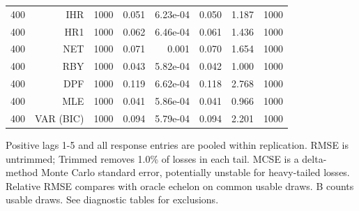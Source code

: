 \begin{table}[p]
\begin{tabular}{rrrrrrrr}
400 & IHR & 1000 & 0.051 & 6.23e-04 & 0.050 & 1.187 & 1000 \\
400 & HR1 & 1000 & 0.062 & 6.46e-04 & 0.061 & 1.436 & 1000 \\
400 & NET & 1000 & 0.071 & 0.001 & 0.070 & 1.654 & 1000 \\
400 & RBY & 1000 & 0.043 & 5.82e-04 & 0.042 & 1.000 & 1000 \\
400 & DPF & 1000 & 0.119 & 6.62e-04 & 0.118 & 2.768 & 1000 \\
400 & MLE & 1000 & 0.041 & 5.86e-04 & 0.041 & 0.966 & 1000 \\
400 & VAR (BIC) & 1000 & 0.094 & 5.79e-04 & 0.094 & 2.201 & 1000 \\
\bottomrule\end{tabular}
\par\medskip
\begin{minipage}{0.98\linewidth}\footnotesize Positive lags 1-5 and all response entries are pooled within replication. RMSE is untrimmed; Trimmed removes 1.0\% of losses in each tail. MCSE is a delta-method Monte Carlo standard error, potentially unstable for heavy-tailed losses. Relative RMSE compares with oracle echelon on common usable draws. B counts usable draws. See diagnostic tables for exclusions.\end{minipage}
\end{table}
